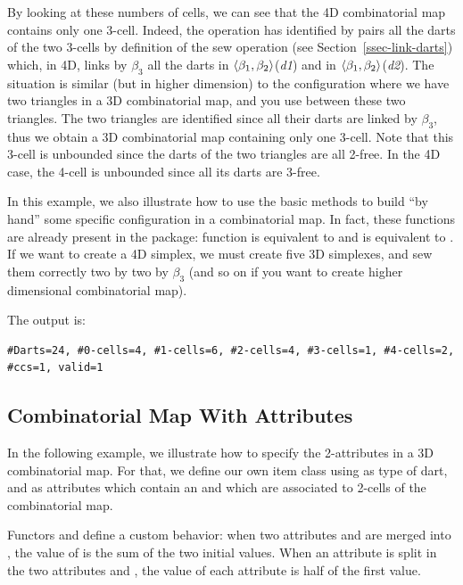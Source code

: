 By looking at these numbers of cells, we can see that the 4D
combinatorial map contains only one 3-cell. Indeed, the 
operation has identified by pairs all the darts of the two 3-cells
by definition of the sew operation (see Section~\ref{ssec-link-darts})
which, in 4D, links by $\beta_3$ all the darts in
$\langle{}\beta_{1},\beta_{2}\rangle{}$(\emph{d1}) and in $\langle{}\beta_{1},\beta_{2}\rangle{}$(\emph{d2}).  The
situation is similar (but in higher dimension) to the
configuration where we have two triangles in a 3D combinatorial map,
and you use  between these two triangles. The two triangles
are identified since all their darts are linked by $\beta_3$, thus we
obtain a 3D combinatorial map containing only one 3-cell. Note that
this 3-cell is unbounded since the darts of the two triangles are all
2-free. In the 4D case, the 4-cell is unbounded since all its darts
are 3-free.

In this example, we also illustrate how to use the basic methods to
build ``by hand'' some specific configuration in a combinatorial
map. In fact, these functions are already present in the package:
function  is equivalent to
 and
 is equivalent to
.  If we want to create a 4D
simplex, we must create five 3D simplexes, and sew them correctly
two by two by $\beta_3$ (and so on if you want to create higher
dimensional combinatorial map).


The output is:
\begin{verbatim}
#Darts=24, #0-cells=4, #1-cells=6, #2-cells=4, #3-cells=1, #4-cells=2, #ccs=1, valid=1
\end{verbatim}

\subsection{Combinatorial Map With Attributes}
\label{ssec-combi-map-with-color}
In the following example, we illustrate how to specify the
2-attributes in a 3D combinatorial map. For that, we define our own
item class using  as type of dart, and
as attributes which contain an  and which are associated to
2-cells of the combinatorial map.

Functors  and  define a
custom behavior: when two attributes  and  are
merged into , the value of  is the sum of the
two initial values.  When an attribute  is split in the two
attributes  and , the value of each attribute is
half of the first value.

